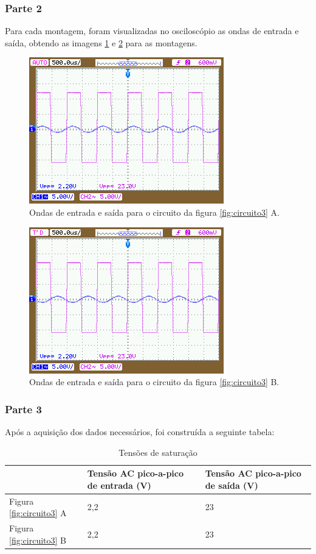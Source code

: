 \documentclass{abntex2}
\begin{document}
\subsubsection{Parte 2}
Para cada montagem, foram visualizadas no osciloscópio as ondas de entrada e saída, obtendo as imagens \ref{fig:inout1} e \ref{fig:inout2} para as montagens.
\begin{figure}[h]
  \centering
  \includegraphics[scale = 0.5]{NewFile0.png}
  \caption{Ondas de entrada e saída para o circuito da figura \ref{fig:circuito3} A.}
  \label{fig:inout1}
\end{figure}
\begin{figure}[h]
  \centering
  \includegraphics[scale = 0.5]{NewFile1.png}
  \caption{Ondas de entrada e saída para o circuito da figura \ref{fig:circuito3} B.}
  \label{fig:inout2}
\end{figure}
\subsubsection{Parte 3}

Após a aquisição dos dados necessários, foi construída a seguinte tabela:

\begin{table}[h!]
\centering
\begin{tabular}{|l|l|l|}
  \hline
   & Tensão AC pico-a-pico de entrada (V) & Tensão AC pico-a-pico de saída (V) \\
  \hline
  Figura \ref{fig:circuito3} A & 2,2 & 23 \\
  \hline
  Figura \ref{fig:circuito3} B & 2,2 & 23 \\
  \hline
\end{tabular}
\caption{Tensões de saturação}
\label{tab:exp3}
\end{table}
\end{document}
